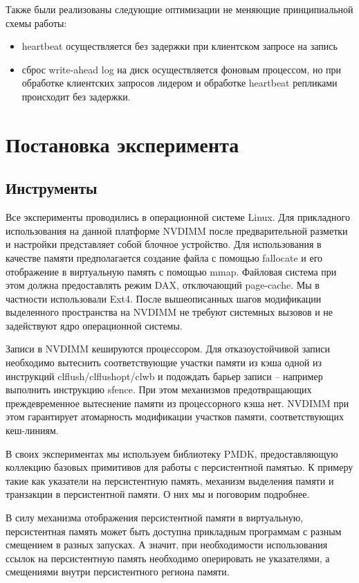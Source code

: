 \documentclass[pdftex,ptm,12pt,a4paper]{report}
\theoremstyle{definition}
\begin{document}
Также были реализованы следующие оптимизации не меняющие принципиальной схемы работы:
\begin{itemize}
\item heartbeat осуществляется без задержки при клиентском запросе на запись
\item сброс write-ahead log на диск осуществляется фоновым процессом, но при обработке клиентских запросов лидером и обработке heartbeat репликами происходит без задержки.
\end{itemize}

\chapter{Постановка эксперимента}
\section{Инструменты}

Все эксперименты проводились в операционной системе Linux.  Для прикладного использования на данной платформе NVDIMM
после предварительной разметки и настройки представляет собой блочное устройство. Для использования в качестве памяти предполагается создание файла с помощью fallocate
и его отображение в виртуальную память с помощью mmap. Файловая система при этом должна предоставлять режим DAX, отключающий page-cache. Мы в частности использовали Ext4.
После вышеописанных шагов модификации выделенного пространства на NVDIMM не требуют системных вызовов и не задействуют ядро операционной системы.

Записи в NVDIMM кешируются процессором. Для отказоустойчивой записи необходимо вытеснить соответствующие участки памяти из кэша одной из инструкций clflush/clflushopt/clwb
и подождать барьер записи -- например выполнить инструкцию sfence. При этом механизмов предотвращающих преждевременное вытеснение памяти из процессорного кэша нет.
NVDIMM при этом гарантирует атомарность модификации участков памяти, соответствующих кеш-линиям.

В своих экспериментах мы используем библиотеку PMDK, предоставляющую коллекцию базовых примитивов для работы с персистентной памятью.
К примеру такие как указатели на персистентную память, механизм выделения памяти и транзакции в персистентной памяти. О них мы и поговорим подробнее.

В силу механизма отображения персистентной памяти в виртуальную, персистентная память может быть доступна прикладным программам с разным смещением в разных запусках.
А значит, при необходимости использования ссылок на персистентную память необходимо оперировать не указателями, а смещениями внутри персистентного региона памяти.
\end{document}
